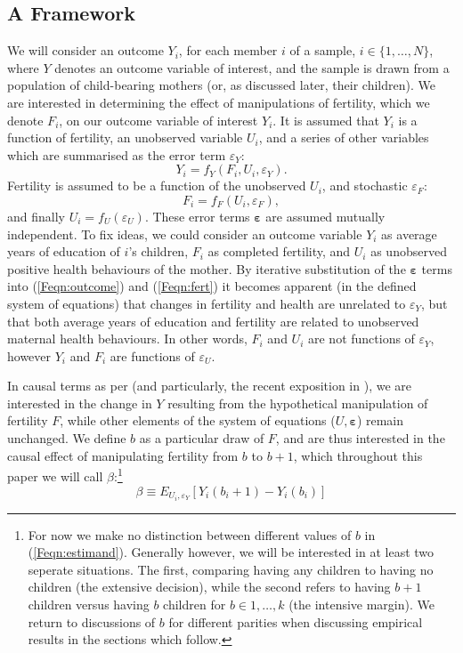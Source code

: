 \documentclass{article}
\begin{document}
\begin{spacing}{1.4}
\subsection{A Framework}
We will consider an outcome $Y_i$, for each member $i$ of a sample, $i \in
\{1,\ldots,N\}$, where $Y$ denotes an outcome variable of interest, and the
sample is drawn from a population of child-bearing mothers (or, as discussed
later, their children). We are 
interested in determining the effect of manipulations of fertility, which we
denote $F_i$, on our outcome variable of interest $Y_i$.  It is assumed that 
$Y_i$ is a function of fertility, an unobserved variable $U_i$, and a series of 
other variables which are summarised as the error term $\varepsilon_Y$:
\begin{equation}
\label{Feqn:outcome}
Y_i=f_Y(F_i,U_i,\varepsilon_Y).
\end{equation}
Fertility is assumed to be a function of the unobserved $U_i$, and stochastic 
$\varepsilon_F$:
\begin{equation}
\label{Feqn:fert}
F_i=f_F(U_i,\varepsilon_F),
\end{equation}
and finally $U_i=f_U(\varepsilon_U)$. These error terms $\bm\varepsilon$ are 
assumed mutually independent. To fix ideas, we could consider an outcome variable 
$Y_i$ as average years of education of $i$'s children, $F_i$ as completed 
fertility, and $U_i$ as unobserved positive health behaviours of the mother. By 
iterative substitution of the $\bm\varepsilon$ terms into (\ref{Feqn:outcome}) 
and (\ref{Feqn:fert}) it becomes apparent (in the defined system of equations) 
that changes in fertility and health are unrelated to $\varepsilon_Y$, but that 
both average years of education and fertility are related to unobserved maternal 
health behaviours. In other words, $F_i$ and $U_i$ are not functions of 
$\varepsilon_Y$, however $Y_i$ and $F_i$ are functions of $\varepsilon_U$.

In causal terms as per \citet{Haavelmo1943,Haavelmo1944} (and particularly, the
recent exposition in \citet{HeckmanPinto2015}), we are interested in the change
in $Y$ resulting from the hypothetical manipulation of fertility $F$, while 
other elements of the system of equations ($U,\bm\varepsilon$) remain unchanged.  
We define $b$ as a particular draw of $F$, and are thus interested in the causal 
effect of manipulating fertility from $b$ to $b+1$, which throughout this paper
we will call $\beta$:\footnote{For now we make no distinction between different 
values of $b$ in (\ref{Feqn:estimand}).  Generally however, we will be interested 
in at least two seperate situations. The first, comparing having any children 
to having no children (the extensive decision), while the second refers to 
having $b+1$ children versus having $b$ children for $b\in{1,\ldots,k}$ (the 
intensive margin).  We return to discussions of $b$ for different parities when
discussing empirical results in the sections which follow.}
\begin{equation}
\label{Feqn:estimand}
\beta\equiv E_{U_i,\varepsilon_Y}[Y_i(b_i+1)-Y_i(b_i)]
\end{equation}


\end{spacing}
\end{document}
